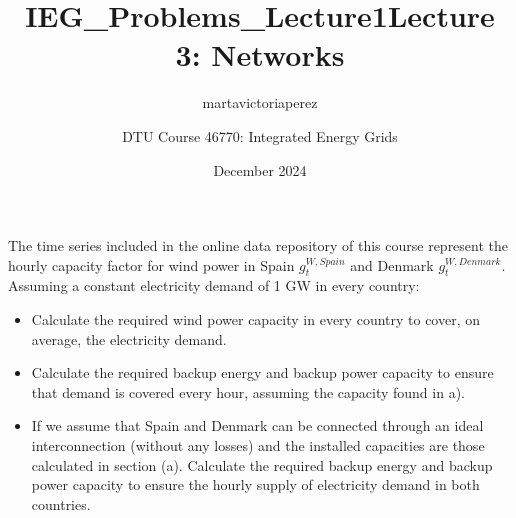 \documentclass[10pt]{article}
\title{IEG_Problems_Lecture1}
\author{martavictoriaperez }
\date{December 2024}
\newenvironment{problem}[2][Problem]{\begin{trivlist}
\item[\hskip \labelsep {\bfseries #1}\hskip \labelsep {\bfseries #2.}]}{\end{trivlist}}
\begin{document}
 
\title{\textbf{Lecture 3: Networks}}
\author{
DTU Course 46770: Integrated Energy Grids }
\maketitle
\begin{problem}{3.1}

The time series included in the online data repository of this course represent the hourly capacity factor for wind power in Spain $g_t^{W,Spain}$ and Denmark $g_t^{W,Denmark}$. Assuming a constant electricity demand of 1 GW in every country:

\begin{itemize}
\item[a)] Calculate the required wind power capacity in every country to cover, on average, the electricity demand. 
\item[b)] 	Calculate the required backup energy and backup power capacity to ensure that demand is covered every hour, assuming the capacity found in a).
\item[c)] If we assume that Spain and Denmark can be connected through an ideal interconnection (without any losses) and the installed capacities are those calculated in section (a). Calculate the required backup energy and backup power capacity to ensure the hourly supply of electricity demand in both countries.
\end{itemize}
\end{problem}

\
\end{document}
